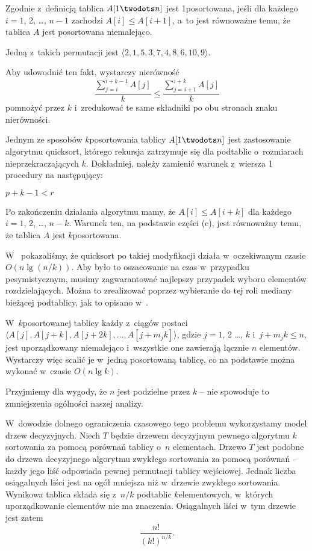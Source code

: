 
\subproblem %
Zgodnie z~definicją tablica $A[1\twodots n]$ jest 1\nbhyphen posortowana, jeśli dla każdego $i=1$, 2, \dots, $n-1$ zachodzi $A[i]\le A[i+1]$, a~to jest równoważne temu, że tablica $A$ jest posortowana niemalejąco.

\subproblem %
Jedną z~takich permutacji jest $\langle2,1,5,3,7,4,8,6,10,9\rangle$.

\subproblem %
Aby udowodnić ten fakt, wystarczy nierówność
\[
	\frac{\sum_{j=i}^{i+k-1}A[j]}{k} \le \frac{\sum_{j=i+1}^{i+k}A[j]}{k}
\]
pomnożyć przez $k$ i~zredukować te same składniki po obu stronach znaku nierówności.

\subproblem %
Jednym ze sposobów $k$\nbhyphen posortowania tablicy $A[1\twodots n]$ jest zastosowanie algorytmu quicksort, którego rekursja zatrzymuje się dla podtablic o~rozmiarach nieprzekraczających $k$.
Dokładniej, należy zamienić warunek z~wiersza 1 procedury  na następujący:
\begin{codebox}
\li	\If $p+k-1<r$
\end{codebox}
Po zakończeniu działania algorytmu mamy, że $A[i]\le A[i+k]$ dla każdego $i=1$, 2, \dots, $n-k$.
Warunek ten, na podstawie części (c), jest równoważny temu, że tablica $A$ jest $k$\nbhyphen posortowana.

W~ pokazaliśmy, że quicksort po takiej modyfikacji działa w~oczekiwanym czasie $O(n\lg(n/k))$.
Aby było to oszacowanie na czas w~przypadku pesymistycznym, musimy zagwarantować najlepszy przypadek wyboru elementów rozdzielających.
Można to zrealizować poprzez wybieranie do tej roli mediany bieżącej podtablicy, jak to opisano w~.

\subproblem %
W~$k$\nbhyphen posortowanej tablicy każdy z~ciągów postaci $\langle A[j],A[j+k],A[j+2k],\dots,A[j+m_jk]\rangle$, gdzie $j=1$, 2 \dots, $k$ i~$j+m_jk\le n$, jest uporządkowany niemalejąco i~wszystkie one zawierają łącznie $n$ elementów.
Wystarczy więc scalić je w~jedną posortowaną tablicę, co na podstawie  można wykonać w~czasie $O(n\lg k)$.

\subproblem %
Przyjmiemy dla wygody, że $n$ jest podzielne przez $k$ -- nie spowoduje to zmniejszenia ogólności naszej analizy.

W~dowodzie dolnego ograniczenia czasowego tego problemu wykorzystamy model drzew decyzyjnych.
Niech $T$ będzie drzewem decyzyjnym pewnego algorytmu $k$\nbhyphen sortowania za pomocą porównań tablicy o~$n$ elementach.
Drzewo $T$ jest podobne do drzewa decyzyjnego algorytmu zwykłego sortowania za pomocą porównań -- każdy jego liść odpowiada pewnej permutacji tablicy wejściowej.
Jednak liczba osiągalnych liści jest na ogół mniejsza niż w~drzewie zwykłego sortowania.
Wynikowa tablica składa się z~$n/k$ podtablic $k$\nbhyphen elementowych, w~których uporządkowanie elementów nie ma znaczenia.
Osiągalnych liści w~tym drzewie jest zatem
\[
    \frac{n!}{(k!)^{n/k}}.
\]

